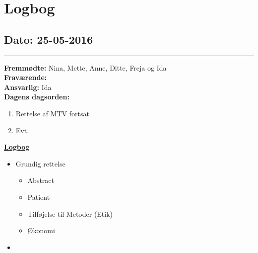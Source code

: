 \chapter{Logbog}
\section{Dato: 25-05-2016}
\hrule
\textbf{Fremmødte:} Nina, Mette, Anne, Ditte, Freja og Ida  \\
\textbf{Fraværende: } \\
\textbf{Ansvarlig:} Ida  \\
\textbf{Dagens dagsorden: }
\begin{enumerate}
\item Rettelse af MTV fortsat
\item Evt.
\end{enumerate}

\underline{\textbf{Logbog}}
\begin{itemize}
\item Grundig rettelse
\begin{itemize}
\item Abstract
\item Patient
\item Tilføjelse til Metoder (Etik)
\item Økonomi
\end{itemize}
\item 
\end{itemize}
\newpage